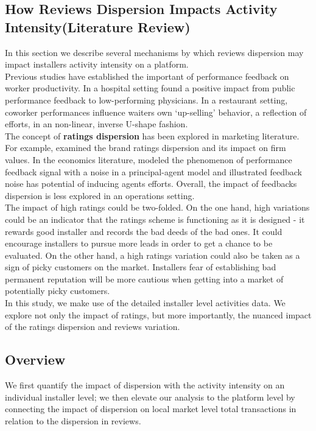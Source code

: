 \documentclass[msom,blindrev]{informs3}
\begin{document}
\subsection{How Reviews Dispersion Impacts Activity Intensity(Literature Review) }
 In this section we describe several mechanisms by which reviews dispersion may impact installers activity intensity on a platform. \\
 Previous studies have established the important of performance feedback on worker productivity. In a hospital setting \cite{song2017closing} found a positive impact from public performance feedback to low-performing physicians. In a restaurant setting, coworker performances influence waiters own `up-selling' behavior, a reflection of efforts, in an non-linear, inverse U-shape fashion. \\
The concept of \textbf{ratings dispersion} has been explored in marketing literature. For example, \cite{luo2013impact} examined the brand ratings dispersion and its impact on firm values. In the economics literature, \cite{marinovic2015credibility} modeled the phenomenon of performance feedback signal with a noise in a principal-agent model and illustrated feedback noise has potential of inducing agents efforts. Overall, the impact of feedbacks dispersion is less explored in an operations setting. \\
The impact of high ratings could be two-folded. On the one hand, high variations could be an indicator that the ratings scheme is functioning as it is designed - it rewards good installer and records the bad deeds of the bad ones. It could encourage installers to pursue more leads in order to get a chance to be evaluated.
On the other hand, a high ratings variation could also be taken as a sign of picky customers on the market. Installers fear of establishing bad permanent reputation will be more cautious when getting into a market of potentially picky customers. \\
In this study, we make use of the detailed installer level activities data. We explore not only the impact of ratings, but more importantly, the nuanced impact of the ratings dispersion and reviews variation.

\subsection{Overview}

We first quantify the impact of dispersion with the activity intensity on an individual installer level; we then elevate our analysis to the platform level by connecting the impact of dispersion on local market level total transactions in relation to the dispersion in reviews.
\end{document}
